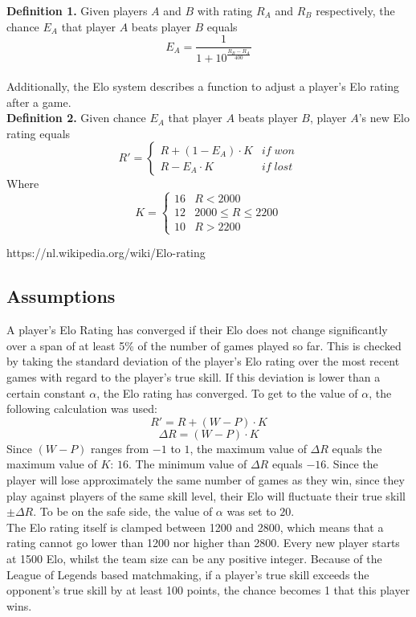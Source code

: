 \documentclass[12pt]{article}
\begin{document}
\textbf{Definition 1.} Given players $A$ and $B$ with rating $R_A$ and $R_B$ respectively, the chance $E_A$ that player $A$ beats player $B$ equals\\
\[ E_A = \frac{1}{1 + 10^{\frac{R_{B}-R_{A}}{400}}} \]\\

Additionally, the Elo system describes a function to adjust a player’s Elo rating after a game.\\

\textbf{Definition 2.} Given chance $E_A$ that player $A$ beats player $B$, player $A$'s new Elo rating equals
\[R' = \begin{cases}
R + (1 - E_A ) \cdot K & if \; won \\ R - E_A \cdot K & if \; lost
\end{cases}\]
Where
\[ K = \begin{cases}
16 & R < 2000 \\ 12 & 2000 \leq R \leq 2200 \\ 10 & R > 2200 
\end{cases}\]

https://nl.wikipedia.org/wiki/Elo-rating


\subsection{Assumptions}
A player’s Elo Rating has converged if their Elo does not change significantly over a span of at least 5\% of the number of games played so far. This is checked by taking the standard deviation of the player's Elo rating over the most recent games with regard to the player’s true skill. If this deviation is lower than a certain constant $\alpha$, the Elo rating has converged. To get to the value of $\alpha$, the following calculation was used:
\[R' = R + (W - P) \cdot K\]
\[\Delta R = (W - P) \cdot K\]
Since $(W - P)$ ranges from $-1$ to $1$, the maximum value of $\Delta R$ equals the maximum value of $K$: $16$. The minimum value of $\Delta R$ equals $-16$. Since the player will lose approximately the same number of games as they win, since they play against players of the same skill level, their Elo will fluctuate their true skill $\pm \Delta R$. To be on the safe side, the value of $\alpha$ was set to $20$.\\
The Elo rating itself is clamped between 1200 and 2800, which means that a rating cannot go lower than 1200 nor higher than 2800. Every new player starts at 1500 Elo, whilst the team size can be any positive integer.
Because of the League of Legends based matchmaking, if a player's true skill exceeds the opponent's true skill by at least 100 points, the chance becomes 1 that this player wins.\\
\end{document}
